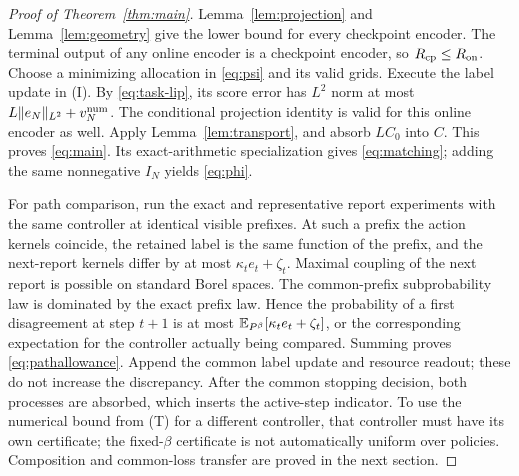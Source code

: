 \begin{proof}[Proof of Theorem~\ref{thm:main}]
Lemma~\ref{lem:projection} and Lemma~\ref{lem:geometry} give the lower bound for every checkpoint encoder. The terminal output of any online encoder is a checkpoint encoder, so $R_{\mathrm{cp}}\le R_{\mathrm{on}}$. Choose a minimizing allocation in \eqref{eq:psi} and its valid grids. Execute the label update in \textup{(I)}. By \eqref{eq:task-lip}, its score error has $L^2$ norm at most $L\lVert e_N\rVert_{L^2}+v_N^{\rm num}$. The conditional projection identity is valid for this online encoder as well. Apply Lemma~\ref{lem:transport}, and absorb $LC_0$ into $C$. This proves \eqref{eq:main}. Its exact-arithmetic specialization gives \eqref{eq:matching}; adding the same nonnegative $I_N$ yields \eqref{eq:phi}.

For path comparison, run the exact and representative report experiments with the same controller at identical visible prefixes. At such a prefix the action kernels coincide, the retained label is the same function of the prefix, and the next-report kernels differ by at most $\kappa_te_t+\zeta_t$. Maximal coupling of the next report is possible on standard Borel spaces. The common-prefix subprobability law is dominated by the exact prefix law. Hence the probability of a first disagreement at step $t+1$ is at most $\mathbb E_{P^\beta}[\kappa_te_t+\zeta_t]$, or the corresponding expectation for the controller actually being compared. Summing proves \eqref{eq:pathallowance}. Append the common label update and resource readout; these do not increase the discrepancy. After the common stopping decision, both processes are absorbed, which inserts the active-step indicator. To use the numerical bound from \textup{(T)} for a different controller, that controller must have its own certificate; the fixed-$\beta$ certificate is not automatically uniform over policies. Composition and common-loss transfer are proved in the next section.
\end{proof}

